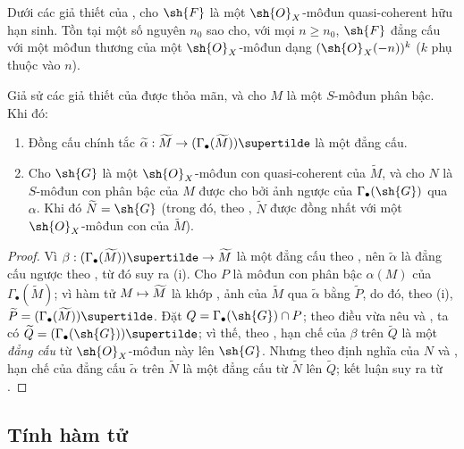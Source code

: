 \documentclass[oneside,10pt]{amsart}
\makeatletter
\renewcommand{\geq}{\geqslant}
\newcommand{\ega@arrow}[2]{\mathchoice{#1}{#2}{#2}{#2}}
\let\ega@shortmapsto\mapsto
\renewcommand{\to}{\ega@arrow{\longrightarrow}{\rightarrow}}
\renewcommand{\mapsto}{\ega@arrow{\longmapsto}{\ega@shortmapsto}}
\let\EGAOriginalLabel\label
\renewcommand{\label}[1]{\phantomsection\EGAOriginalLabel{#1}}
\makeatother
\begin{document}
\begin{corollary}[2.7.10]
\label{II.2.7.10}
Dưới các giả thiết của , cho $\sh{F}$ là một $\sh{O}_X$-môđun quasi-coherent hữu hạn sinh.
Tồn tại một số nguyên $n_0$ sao cho, với mọi $n\geq n_0$, $\sh{F}$ đẳng cấu với một môđun thương của một $\sh{O}_X$-môđun dạng $(\sh{O}_X(-n))^k$ ($k$ phụ thuộc vào $n$).
\end{corollary}

\begin{proposition}[2.7.11]
\label{II.2.7.11}
Giả sử các giả thiết của  được thỏa mãn, và cho $M$ là một $S$-môđun phân bậc.
Khi đó:
\begin{enumerate}
  \item[\rm{(i)}] Đồng cấu chính tắc $\widetilde{\alpha}:\widetilde{M}\to(\Gamma_\bullet(\widetilde{M}))\supertilde$ là một đẳng cấu.
  \item[\rm{(ii)}] Cho $\sh{G}$ là một $\sh{O}_X$-môđun con quasi-coherent của $\widetilde{M}$, và cho $N$ là $S$-môđun con phân bậc của $M$ được cho bởi ảnh ngược của $\Gamma_\bullet(\sh{G})$ qua $\alpha$.
    Khi đó $\widetilde{N}=\sh{G}$ (trong đó, theo , $\widetilde{N}$ được đồng nhất với một $\sh{O}_X$-môđun con của $\widetilde{M}$).
\end{enumerate}
\end{proposition}

\begin{proof}
Vì $\beta:(\Gamma_\bullet(\widetilde{M}))\supertilde\to\widetilde{M}$ là một đẳng cấu theo , nên $\widetilde{\alpha}$ là đẳng cấu ngược theo , từ đó suy ra (i).
Cho $P$ là môđun con phân bậc $\alpha(M)$ của $\Gamma_\bullet(\widetilde{M})$;
vì hàm tử $M\mapsto\widetilde{M}$ là khớp , ảnh của $\widetilde{M}$ qua $\widetilde{\alpha}$ bằng $\widetilde{P}$, do đó, theo (i), $\widetilde{P}=(\Gamma_\bullet(\widetilde{M}))\supertilde$.
Đặt $Q=\Gamma_\bullet(\sh{G})\cap P$;
theo điều vừa nêu và , ta có $\widetilde{Q}=(\Gamma_\bullet(\sh{G}))\supertilde$; vì thế, theo , hạn chế của $\beta$ trên $\widetilde{Q}$ là một \emph{đẳng cấu} từ $\sh{O}_X$-môđun này lên $\sh{G}$.
Nhưng theo định nghĩa của $N$ và , hạn chế của đẳng cấu $\widetilde{\alpha}$ trên $\widetilde{N}$ là một đẳng cấu từ $\widetilde{N}$ lên $\widetilde{Q}$; kết luận suy ra từ .
\end{proof}

\subsection{Tính hàm tử}
\label{subsection:II.2.8}
\end{document}
